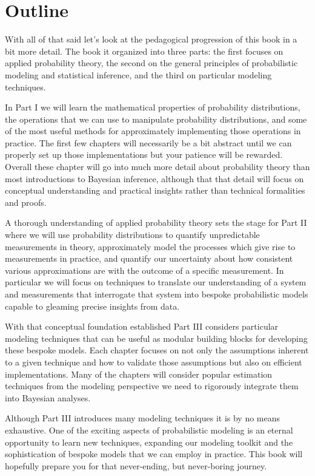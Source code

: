 \documentclass[
  letterpaper,
  DIV=11,
  numbers=noendperiod]{scrartcl}
\begin{document}
\hypertarget{outline}{%
\section{Outline}\label{outline}}

With all of that said let's look at the pedagogical progression of this
book in a bit more detail. The book it organized into three parts: the
first focuses on applied probability theory, the second on the general
principles of probabilistic modeling and statistical inference, and the
third on particular modeling techniques.

In Part I we will learn the mathematical properties of probability
distributions, the operations that we can use to manipulate probability
distributions, and some of the most useful methods for approximately
implementing those operations in practice. The first few chapters will
necessarily be a bit abstract until we can properly set up those
implementations but your patience will be rewarded. Overall these
chapter will go into much more detail about probability theory than most
introductions to Bayesian inference, although that that detail will
focus on conceptual understanding and practical insights rather than
technical formalities and proofs.

A thorough understanding of applied probability theory sets the stage
for Part II where we will use probability distributions to quantify
unpredictable measurements in theory, approximately model the processes
which give rise to measurements in practice, and quantify our
uncertainty about how consistent various approximations are with the
outcome of a specific measurement. In particular we will focus on
techniques to translate our understanding of a system and measurements
that interrogate that system into bespoke probabilistic models capable
to gleaming precise insights from data.

With that conceptual foundation established Part III considers
particular modeling techniques that can be useful as modular building
blocks for developing these bespoke models. Each chapter focuses on not
only the assumptions inherent to a given technique and how to validate
those assumptions but also on efficient implementations. Many of the
chapters will consider popular estimation techniques from the modeling
perspective we need to rigorously integrate them into Bayesian analyses.

Although Part III introduces many modeling techniques it is by no means
exhaustive. One of the exciting aspects of probabilistic modeling is an
eternal opportunity to learn new techniques, expanding our modeling
toolkit and the sophistication of bespoke models that we can employ in
practice. This book will hopefully prepare you for that never-ending,
but never-boring journey.
\end{document}
